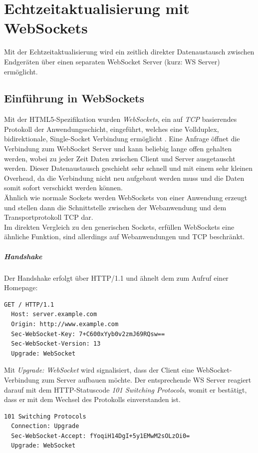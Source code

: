 \chapter{Echtzeitaktualisierung mit WebSockets}
Mit der Echtzeitaktualisierung wird ein zeitlich direkter Datenaustausch zwischen Endgeräten über einen separaten WebSocket Server (kurz: WS Server) ermöglicht. 

\section{Einführung in WebSockets}
Mit der HTML5-Spezifikation wurden \emph{WebSockets}, ein auf \emph{TCP} basierendes Protokoll der Anwendungsschicht, eingeführt, welches eine Vollduplex, bidirektionale, Single-Socket Verbindung ermöglicht \cite[S. 7]{ws}. Eine Anfrage öffnet die Verbindung zum WebSocket Server und kann beliebig lange offen gehalten werden, wobei zu jeder Zeit Daten zwischen Client und Server ausgetauscht werden. Dieser Datenaustausch geschieht sehr schnell und mit einem sehr kleinen Overhead, da die Verbindung nicht neu aufgebaut werden muss und die Daten somit sofort verschickt werden können.\\
Ähnlich wie \glqq normale\grqq{} Sockets werden WebSockets von einer Anwendung erzeugt und stellen dann die Schnittstelle zwischen der Webanwendung und dem Transportprotokoll TCP dar.\\
Im direkten Vergleich zu den generischen Sockets, erfüllen WebSockets eine ähnliche Funktion, sind allerdings auf Webanwendungen und TCP beschränkt. 

\paragraph{Handshake} 
Der Handshake erfolgt über HTTP/1.1 und ähnelt dem zum Aufruf einer Homepage:
\\
\begin{lstlisting}[captionpos=b, caption=HTTP Request des Clients {\cite[S. 6]{rfc6455:handshake}}]
  GET / HTTP/1.1
  Host: server.example.com
  Origin: http://www.example.com
  Sec-WebSocket-Key: 7+C600xYyb0v2zmJ69RQsw==
  Sec-WebSocket-Version: 13
  Upgrade: WebSocket
\end{lstlisting}

Mit \emph{Upgrade: WebSocket} wird signalisiert, dass der Client eine WebSocket-Verbindung zum Server aufbauen möchte. Der entsprechende WS Server reagiert darauf mit dem HTTP-Statuscode \emph{101 Switching Protocols}, womit er bestätigt, dass er mit dem Wechsel des Protokolls einverstanden ist.
\\
\begin{lstlisting}[captionpos=b, caption=HTTP Response des Servers {\cite[S. 8]{rfc6455:handshake}}]
  101 Switching Protocols
  Connection: Upgrade
  Sec-WebSocket-Accept: fYoqiH14DgI+5y1EMwM2sOLzOi0=
  Upgrade: WebSocket
\end{lstlisting}

